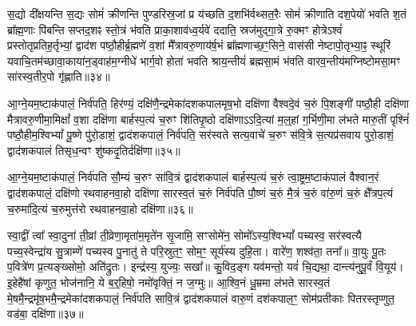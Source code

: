 {\anuvakamend[{आ॒ग्ने॒यं द्विच॑त्वारिꣳशत्॥17॥}]}

स॒द्यो दी᳚क्षयन्ति स॒द्यः सोमं॑ क्रीणन्ति पुण्डरिस्र॒जां प्र य॑च्छति द॒शभि॑र्वथ्सत॒रैः सोमं॑ क्रीणाति दश॒पेयो॑ भवति श॒तं ब्रा᳚ह्म॒णाः पि॑बन्ति सप्तद॒शꣴ स्तो॒त्रं भ॑वति प्राका॒शाव॑ध्व॒र्यवे॑ ददाति॒ स्रज॑मुद्गा॒त्रे रु॒क्मꣳ होत्रे\-ऽश्वं॑ प्रस्तोतृप्रतिह॒र्तृभ्यां॒ द्वाद॑श पष्ठौ॒हीर्ब्र॒ह्मणे॑ व॒शां मै᳚त्रावरु॒णाय॑र्\mbox{}ष॒भं ब्रा᳚ह्मणाच्छ॒ꣳ॒सिने॒ वास॑सी नेष्टापो॒तृभ्या॒ꣴ॒ स्थूरि॑ यवाचि॒तम॑च्छावा॒काया॑न॒ड्वाह॑म॒ग्नीधे॑ भार्ग॒वो होता॑ भवति श्राय॒न्तीयं॑ ब्रह्मसा॒मं भ॑वति वारव॒न्तीय॑मग्निष्टोमसा॒मꣳ सा॑रस्व॒तीर॒पो गृ॑ह्णाति॥३४॥

{\anuvakamend[{वा॒र॒व॒न्तीयं॑ च॒त्वारि॑ च॥18॥}]}

आ॒ग्ने॒यम॒ष्टाक॑पालं॒ निर्व॑पति॒ हिर॑ण्यं॒ दक्षि॑णै॒न्द्रमेका॑दशकपालमृष॒भो दक्षि॑णा वैश्वदे॒वं च॒रुं पि॒शङ्गी॑ पष्ठौ॒ही दक्षि॑णा मैत्रावरु॒णीमा॒मिक्षां᳚ व॒शा दक्षि॑णा बार्\mbox{}हस्प॒त्यं च॒रुꣳ शि॑तिपृ॒ष्ठो दक्षि॑णा\-ऽ\-ऽदि॒त्यां म॒ल्॒\mbox{}हां ग॒र्भिणी॒मा ल॑भते मारु॒तीं पृश्निं॑ पष्ठौ॒हीम॒श्वि\-भ्यां᳚ पू॒ष्णे पु॑रो॒डाशं॒ द्वाद॑शकपालं॒ निर्व॑पति॒ सर॑स्वते सत्य॒वाचे॑ च॒रुꣳ स॑वि॒त्रे स॒त्यप्र॑सवाय पुरो॒डाशं॒ द्वाद॑शकपालं तिसृध॒न्वꣳ शु॑ष्कदृ॒तिर्दक्षि॑णा॥३५॥

{\anuvakamend[{आ॒ग्ने॒यꣳ स॒प्तच॑त्वारिꣳशत्॥19॥}]}

आ॒ग्ने॒यम॒ष्टाक॑पालं॒ निर्व॑पति सौ॒म्यं च॒रुꣳ सा॑वि॒त्रं द्वाद॑शकपालं बार्\mbox{}हस्प॒त्यं च॒रुं त्वा॒ष्ट्रम॒ष्टाक॑पालं वैश्वान॒रं द्वाद॑शकपालं॒ दक्षि॑णो रथवाहनवा॒हो दक्षि॑णा सारस्व॒तं च॒रुं निर्व॑पति पौ॒ष्णं च॒रुं मै॒त्रं च॒रुं वा॑रु॒णं च॒रुं क्षै᳚त्रप॒त्यं च॒रुमा॑दि॒त्यं च॒रुमुत्त॑रो रथवाहनवा॒हो दक्षि॑णा॥३६॥

{\anuvakamend[{आ॒ग्ने॒यं चतु॑स्त्रिꣳशत्॥20॥}]}

स्वा॒द्वीं त्वा᳚ स्वा॒दुना॑ ती॒व्रां ती॒व्रेणा॒मृता॑म॒मृते॑न सृ॒जामि॒ सꣳसोमे॑न॒ सोमो᳚\-ऽस्य॒श्वि\-भ्यां᳚ पच्यस्व॒ सर॑स्वत्यै पच्य॒स्वेन्द्रा॑य सु॒त्राम्णे॑ पच्यस्व पु॒नातु॑ ते परि॒स्रुत॒ꣳ॒ सोम॒ꣳ॒ सूर्य॑स्य दुहि॒ता। वारे॑ण॒ शश्व॑ता॒ तना᳚॥ वा॒युः पू॒तः प॒वित्रे॑ण प्र॒त्यङ्ख्सोमो॒ अति॑द्रुतः। इन्द्र॑स्य॒ युज्यः॒ सखा᳚॥ कु॒विद॒ङ्ग यव॑मन्तो॒ यवं॑ चि॒द्यथा॒ दान्त्य॑नुपू॒र्वं वि॒यूय॑। इ॒हेहै॑षां कृणुत॒ भोज॑नानि॒ ये ब॒र्॒\mbox{}हिषो॒ नमो॑वृक्तिं॒ न ज॒ग्मुः॥ आ॒श्वि॒नं धू॒म्रमा ल॑भते सारस्व॒तं मे॒षमै॒न्द्रमृ॑ष॒भमै॒न्द्रमेका॑दशकपालं॒ निर्व॑पति सावि॒त्रं द्वाद॑शकपालं वारु॒णं दश॑कपाल॒ꣳ॒ सोम॑प्रतीकाः पितरस्तृप्णुत॒ वड॑बा॒ दक्षि॑णा॥३७॥

{\anuvakamend[{भोज॑नानि॒ षड््विꣳ॑शतिश्च॥21॥}]}

